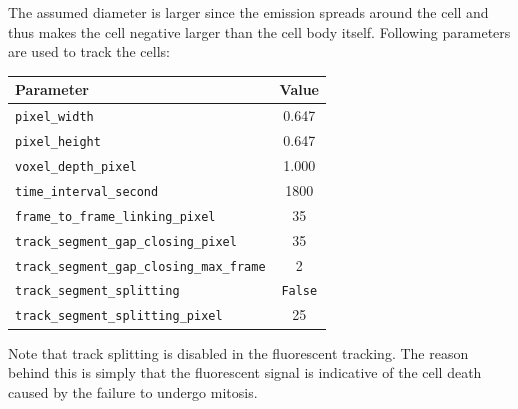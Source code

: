 \documentclass[pdftex,12pt,a4paper]{report}
\begin{document}
The assumed diameter is larger since the emission spreads around the cell and thus makes the cell negative larger than the cell body itself. Following parameters are used to track the cells:

\begin{table}[H]
\centering
\begin{tabular}[t]{ l | c }
\hline
Parameter & Value \\
\hline\hline
\texttt{pixel\_width} & 0.647 \\
\texttt{pixel\_height} & 0.647 \\
\texttt{voxel\_depth\_pixel} & 1.000 \\
\texttt{time\_interval\_second} & 1800\\
\texttt{frame\_to\_frame\_linking\_pixel} & 35 \\
\texttt{track\_segment\_gap\_closing\_pixel} & 35 \\
\texttt{track\_segment\_gap\_closing\_max\_frame} & 2 \\
\texttt{track\_segment\_splitting} & \texttt{False} \\
\texttt{track\_segment\_splitting\_pixel} & 25 \\
\hline
\end{tabular}
\end{table}

Note that track splitting is disabled in the fluorescent tracking. The reason behind this is simply that the fluorescent signal is indicative of the cell death caused by the failure to undergo mitosis.
\end{document}
